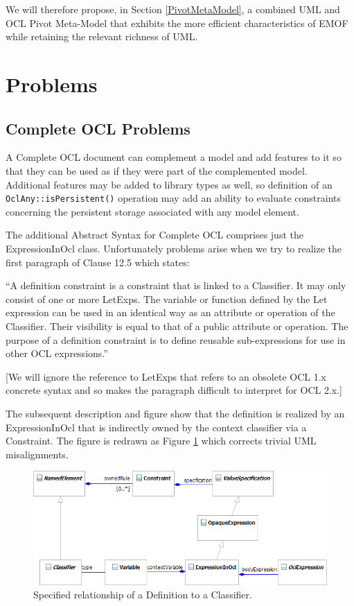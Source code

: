 \documentclass{eceasst}
\begin{document}
We will therefore propose, in Section \ref{PivotMetaModel},  a combined UML and OCL Pivot Meta-Model that exhibits the more efficient characteristics of EMOF while retaining the relevant richness of UML.

\section{Problems}\label{Problems}

\subsection{Complete OCL Problems}\label{CompleteOCL}

A Complete OCL document can complement a model and add features to it so that they can be used as if they were part of the complemented model. Additional features may be added to library types as well, so definition of an \verb|OclAny::isPersistent()| operation may add an ability to evaluate constraints concerning the persistent storage associated with any model element.

The additional Abstract Syntax for Complete OCL comprises just the ExpressionInOcl class. Unfortunately problems arise when we try to realize the first paragraph of Clause 12.5 which states:

``A definition constraint is a constraint that is linked to a Classifier. It may only consist of one or more LetExps. The
variable or function defined by the Let expression can be used in an identical way as an attribute or operation of the
Classifier. Their visibility is equal to that of a public attribute or operation. The purpose of a definition constraint is to
define reusable sub-expressions for use in other OCL expressions.''

[We will ignore the reference to LetExps that refers to an obsolete OCL 1.x concrete syntax and so makes the paragraph difficult to interpret for OCL 2.x.]

The subsequent description and figure show that the definition is realized by an ExpressionInOcl that is indirectly owned by the context classifier via a Constraint. The figure is redrawn as Figure \ref{fig:Definition} which corrects trivial UML misalignments. 

\begin{figure}
  \begin{center}
    \includegraphics[width=5.75in]{Definition.png}
  \end{center}
  \caption{Specified relationship of a Definition to a Classifier.}
  \label{fig:Definition}
\end{figure}
\end{document}
